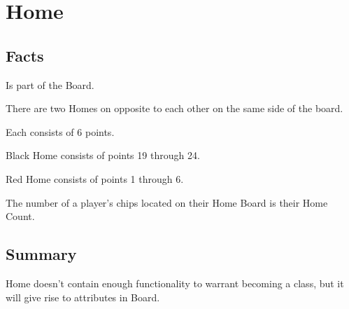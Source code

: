 \section{Home}

\subsection{Facts}

\begin{dashed}
    \item Is part of the Board.
    \item There are two Homes on opposite to each other on the same side of the board.
    \item Each consists of 6 points.
    \item Black Home consists of points 19 through 24.
    \item Red Home consists of points 1 through 6.
    \item The number of a player’s chips located on their Home Board is their Home Count.
\end{dashed}


\subsection{Summary}
Home doesn't contain enough functionality to warrant becoming a class, but it will give rise to attributes in Board.
